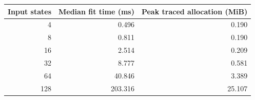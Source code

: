 \begin{tabular}{@{}rrr@{}}
\toprule
Input states & Median fit time (ms) & Peak traced allocation (MiB)\\
\midrule
4 & 0.496 & 0.190\\
8 & 0.811 & 0.190\\
16 & 2.514 & 0.209\\
32 & 8.777 & 0.581\\
64 & 40.846 & 3.389\\
128 & 203.316 & 25.107\\
\bottomrule
\end{tabular}
